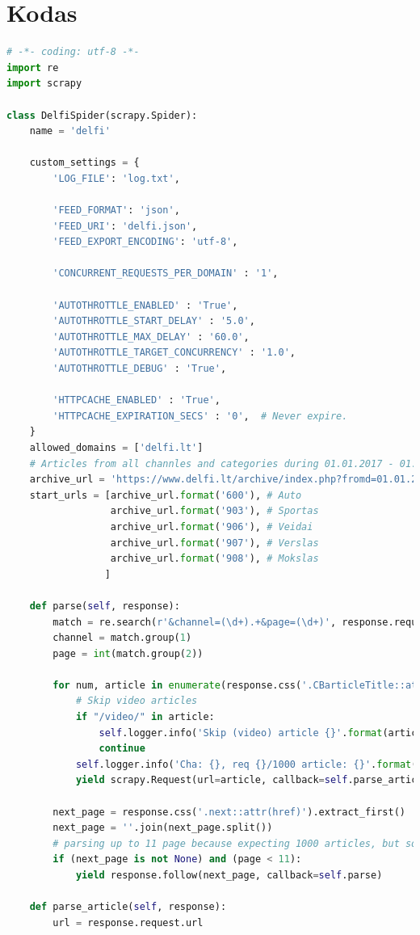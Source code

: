 \documentclass{VUMIFInfKursinis}
\begin{document}
\clearpage



\section{Kodas}\label{code}
\begin{lstlisting}[language=Python, caption=Internetinio roboto kodas]
# -*- coding: utf-8 -*-
import re
import scrapy
 
class DelfiSpider(scrapy.Spider):
    name = 'delfi'
 
    custom_settings = {
        'LOG_FILE': 'log.txt',
 
        'FEED_FORMAT': 'json',
        'FEED_URI': 'delfi.json',
        'FEED_EXPORT_ENCODING': 'utf-8',
 
        'CONCURRENT_REQUESTS_PER_DOMAIN' : '1',
 
        'AUTOTHROTTLE_ENABLED' : 'True',
        'AUTOTHROTTLE_START_DELAY' : '5.0',
        'AUTOTHROTTLE_MAX_DELAY' : '60.0',
        'AUTOTHROTTLE_TARGET_CONCURRENCY' : '1.0',
        'AUTOTHROTTLE_DEBUG' : 'True',
 
        'HTTPCACHE_ENABLED' : 'True',
        'HTTPCACHE_EXPIRATION_SECS' : '0',  # Never expire.
    }
    allowed_domains = ['delfi.lt']
    # Articles from all channles and categories during 01.01.2017 - 01.01.2018 period
    archive_url = 'https://www.delfi.lt/archive/index.php?fromd=01.01.2017&tod=01.01.2018&channel={}&category=0&query=&page=1'
    start_urls = [archive_url.format('600'), # Auto
                  archive_url.format('903'), # Sportas
                  archive_url.format('906'), # Veidai
                  archive_url.format('907'), # Verslas
                  archive_url.format('908'), # Mokslas
                 ]
 
    def parse(self, response):
        match = re.search(r'&channel=(\d+).+&page=(\d+)', response.request.url)
        channel = match.group(1)
        page = int(match.group(2))
 
        for num, article in enumerate(response.css('.CBarticleTitle::attr(href)').extract()):
            # Skip video articles
            if "/video/" in article:
                self.logger.info('Skip (video) article {}'.format(article))
                continue
            self.logger.info('Cha: {}, req {}/1000 article: {}'.format(channel, (page-1)*100+num+1, article))
            yield scrapy.Request(url=article, callback=self.parse_article)
 
        next_page = response.css('.next::attr(href)').extract_first()
        next_page = ''.join(next_page.split())
        # parsing up to 11 page because expecting 1000 articles, but some are skipped (video)
        if (next_page is not None) and (page < 11):
            yield response.follow(next_page, callback=self.parse)
 
    def parse_article(self, response):
        url = response.request.url

\end{lstlisting}
\end{document}
